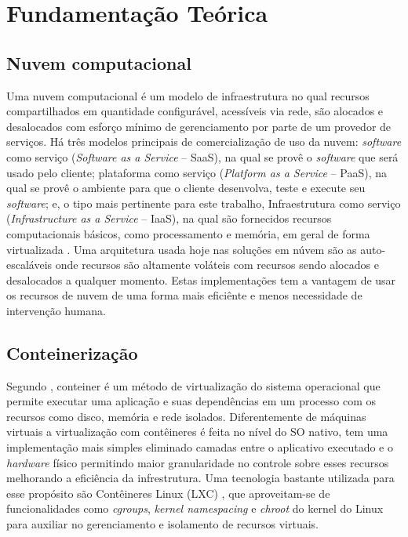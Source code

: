 \chapter{Fundamentação Teórica}

\section{Nuvem computacional}
\label{sec:computacaonuvem}

Uma nuvem computacional é um modelo de infraestrutura no qual recursos compartilhados em quantidade configurável, acessíveis via rede, são alocados e desalocados com esforço mínimo de gerenciamento por parte de um provedor de serviços.
%
Há três modelos principais de comercialização de uso da nuvem: \textit{software} como serviço (\textit{Software as a Service} -- SaaS), na qual se provê o \textit{software} que será usado pelo cliente; plataforma como serviço (\textit{Platform as a Service} -- PaaS), na qual se provê o ambiente para que o cliente desenvolva, teste e execute seu \textit{software}; e, o tipo mais pertinente para este trabalho, Infraestrutura como serviço (\textit{Infrastructure as a Service} -- IaaS), na qual são fornecidos recursos computacionais básicos, como processamento e memória, em geral de forma virtualizada \cite{NIST2011}.
%
Uma arquitetura usada hoje nas soluções em núvem são as auto-escaláveis onde recursos são altamente voláteis com recursos sendo alocados e desalocados a qualquer momento. Estas implementações tem a vantagem de usar os recursos de nuvem de uma forma mais eficiênte e menos necessidade de intervenção humana.


\section{Conteinerização}
\label{sec:conteiner}

Segundo \cite{AmazonContainer}, conteiner é um método de virtualização do sistema operacional que permite executar uma aplicação e suas dependências em um processo com os recursos como disco, memória e rede isolados.
%
Diferentemente de máquinas virtuais a virtualização com contêineres é feita no nível do SO nativo, tem uma implementação mais simples eliminado camadas entre o aplicativo executado e o \textit{hardware} físico permitindo maior granularidade no controle sobre esses recursos melhorando a eficiência da infrestrutura.
%
Uma tecnologia bastante utilizada para esse propósito são Contêineres Linux (LXC) \cite{Linuxcontainers.org2015}, que aproveitam-se de funcionalidades como \textit{cgroups}, \textit{kernel namespacing} e \textit{chroot} do kernel do Linux para auxiliar no gerenciamento e isolamento de recursos virtuais.

